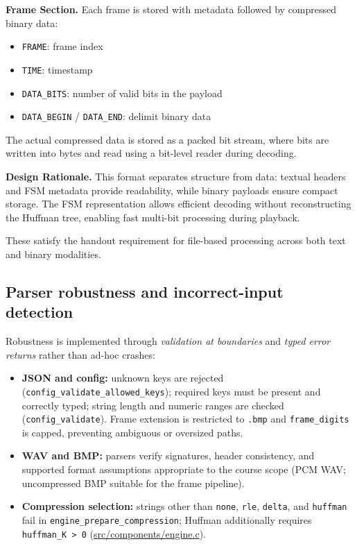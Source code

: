 \vspace{0.3em}
\noindent \textbf{Frame Section.}  
Each frame is stored with metadata followed by compressed binary data:
\begin{itemize}
    \item \texttt{FRAME}: frame index
    \item \texttt{TIME}: timestamp
    \item \texttt{DATA\_BITS}: number of valid bits in the payload
    \item \texttt{DATA\_BEGIN} / \texttt{DATA\_END}: delimit binary data
\end{itemize}

\noindent The actual compressed data is stored as a packed bit stream, where bits are written into bytes and read using a bit-level reader during decoding.

\vspace{0.3em}
\noindent \textbf{Design Rationale.}  
This format separates structure from data: textual headers and FSM metadata provide readability, while binary payloads ensure compact storage. The FSM representation allows efficient decoding without reconstructing the Huffman tree, enabling fast multi-bit processing during playback.


\noindent These satisfy the handout requirement for file-based processing across both text and binary modalities.


\subsection{Parser robustness and incorrect-input detection}
Robustness is implemented through \emph{validation at boundaries} and \emph{typed error returns} rather than ad-hoc crashes:

\begin{itemize}
    \item \textbf{JSON and config:} unknown keys are rejected (\texttt{config\_validate\_allowed\_keys}); required keys must be present and correctly typed; string length and numeric ranges are checked (\texttt{config\_validate}). Frame extension is restricted to \texttt{.bmp} and \texttt{frame\_digits} is capped, preventing ambiguous or oversized paths.
    \item \textbf{WAV and BMP:} parsers verify signatures, header consistency, and supported format assumptions appropriate to the course scope (PCM WAV; uncompressed BMP suitable for the frame pipeline).
    \item \textbf{Compression selection:} strings other than \texttt{none}, \texttt{rle}, \texttt{delta}, and \texttt{huffman} fail in \texttt{engine\_prepare\_compression}; Huffman additionally requires \texttt{huffman\_K > 0} (\url{src/components/engine.c}).
\end{itemize}

